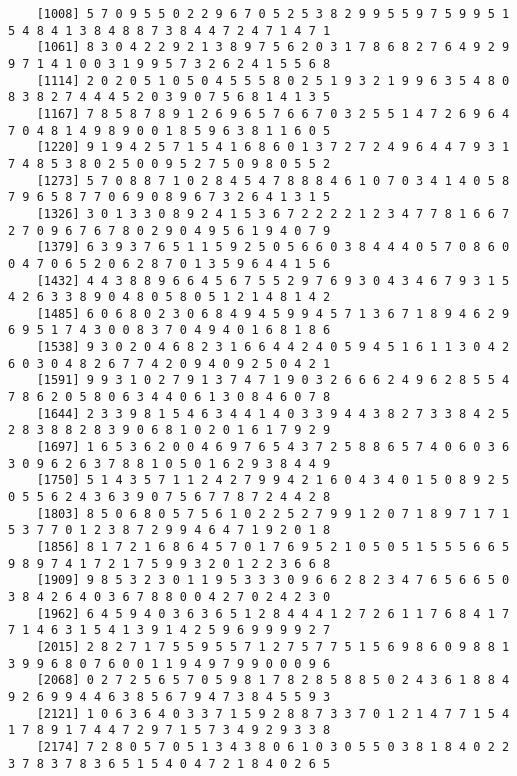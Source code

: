 \documentclass{article}
\begin{document}
\begin{itemize}
\begin{scriptsize}
\begin{verbatim}
	[1008] 5 7 0 9 5 5 0 2 2 9 6 7 0 5 2 5 3 8 2 9 9 5 5 9 7 5 9 9 5 1 5 4 8 4 1 3 8 4 8 8 7 3 8 4 4 7 2 4 7 1 4 7 1
	[1061] 8 3 0 4 2 2 9 2 1 3 8 9 7 5 6 2 0 3 1 7 8 6 8 2 7 6 4 9 2 9 9 7 1 4 1 0 0 3 1 9 9 5 7 3 2 6 2 4 1 5 5 6 8
	[1114] 2 0 2 0 5 1 0 5 0 4 5 5 5 8 0 2 5 1 9 3 2 1 9 9 6 3 5 4 8 0 8 3 8 2 7 4 4 4 5 2 0 3 9 0 7 5 6 8 1 4 1 3 5
	[1167] 7 8 5 8 7 8 9 1 2 6 9 6 5 7 6 6 7 0 3 2 5 5 1 4 7 2 6 9 6 4 7 0 4 8 1 4 9 8 9 0 0 1 8 5 9 6 3 8 1 1 6 0 5
	[1220] 9 1 9 4 2 5 7 1 5 4 1 6 8 6 0 1 3 7 2 7 2 4 9 6 4 4 7 9 3 1 7 4 8 5 3 8 0 2 5 0 0 9 5 2 7 5 0 9 8 0 5 5 2
	[1273] 5 7 0 8 8 7 1 0 2 8 4 5 4 7 8 8 8 4 6 1 0 7 0 3 4 1 4 0 5 8 7 9 6 5 8 7 7 0 6 9 0 8 9 6 7 3 2 6 4 1 3 1 5
	[1326] 3 0 1 3 3 0 8 9 2 4 1 5 3 6 7 2 2 2 2 1 2 3 4 7 7 8 1 6 6 7 2 7 0 9 6 7 6 7 8 0 2 9 0 4 9 5 6 1 9 4 0 7 9
	[1379] 6 3 9 3 7 6 5 1 1 5 9 2 5 0 5 6 6 0 3 8 4 4 4 0 5 7 0 8 6 0 0 4 7 0 6 5 2 0 6 2 8 7 0 1 3 5 9 6 4 4 1 5 6
	[1432] 4 4 3 8 8 9 6 6 4 5 6 7 5 5 2 9 7 6 9 3 0 4 3 4 6 7 9 3 1 5 4 2 6 3 3 8 9 0 4 8 0 5 8 0 5 1 2 1 4 8 1 4 2
	[1485] 6 0 6 8 0 2 3 0 6 8 4 9 4 5 9 9 4 5 7 1 3 6 7 1 8 9 4 6 2 9 6 9 5 1 7 4 3 0 0 8 3 7 0 4 9 4 0 1 6 8 1 8 6
	[1538] 9 3 0 2 0 4 6 8 2 3 1 6 6 4 4 2 4 0 5 9 4 5 1 6 1 1 3 0 4 2 6 0 3 0 4 8 2 6 7 7 4 2 0 9 4 0 9 2 5 0 4 2 1
	[1591] 9 9 3 1 0 2 7 9 1 3 7 4 7 1 9 0 3 2 6 6 6 2 4 9 6 2 8 5 5 4 7 8 6 2 0 5 8 0 6 3 4 4 0 6 1 3 0 8 4 6 0 7 8
	[1644] 2 3 3 9 8 1 5 4 6 3 4 4 1 4 0 3 3 9 4 4 3 8 2 7 3 3 8 4 2 5 2 8 3 8 8 2 8 3 9 0 6 8 1 0 2 0 1 6 1 7 9 2 9
	[1697] 1 6 5 3 6 2 0 0 4 6 9 7 6 5 4 3 7 2 5 8 8 6 5 7 4 0 6 0 3 6 3 0 9 6 2 6 3 7 8 8 1 0 5 0 1 6 2 9 3 8 4 4 9
	[1750] 5 1 4 3 5 7 1 1 2 4 2 7 9 9 4 2 1 6 0 4 3 4 0 1 5 0 8 9 2 5 0 5 5 6 2 4 3 6 3 9 0 7 5 6 7 7 8 7 2 4 4 2 8
	[1803] 8 5 0 6 8 0 5 7 5 6 1 0 2 2 5 2 7 9 9 1 2 0 7 1 8 9 7 1 7 1 5 3 7 7 0 1 2 3 8 7 2 9 9 4 6 4 7 1 9 2 0 1 8
	[1856] 8 1 7 2 1 6 8 6 4 5 7 0 1 7 6 9 5 2 1 0 5 0 5 1 5 5 5 6 6 5 9 8 9 7 4 1 7 2 1 7 5 9 9 3 2 0 1 2 2 3 6 6 8
	[1909] 9 8 5 3 2 3 0 1 1 9 5 3 3 3 0 9 6 6 2 8 2 3 4 7 6 5 6 6 5 0 3 8 4 2 6 4 0 3 6 7 8 8 0 0 4 2 7 0 2 4 2 3 0
	[1962] 6 4 5 9 4 0 3 6 3 6 5 1 2 8 4 4 4 1 2 7 2 6 1 1 7 6 8 4 1 7 7 1 4 6 3 1 5 4 1 3 9 1 4 2 5 9 6 9 9 9 9 2 7
	[2015] 2 8 2 7 1 7 5 5 9 5 5 7 1 2 7 5 7 7 5 1 5 6 9 8 6 0 9 8 8 1 3 9 9 6 8 0 7 6 0 0 1 1 9 4 9 7 9 9 0 0 0 9 6
	[2068] 0 2 7 2 5 6 5 7 0 5 9 8 1 7 8 2 8 5 8 8 5 0 2 4 3 6 1 8 8 4 9 2 6 9 9 4 4 6 3 8 5 6 7 9 4 7 3 8 4 5 5 9 3
	[2121] 1 0 6 3 6 4 0 3 3 7 1 5 9 2 8 8 7 3 3 7 0 1 2 1 4 7 7 1 5 4 1 7 8 9 1 7 4 4 7 2 9 7 1 5 7 3 4 9 2 9 3 3 8
	[2174] 7 2 8 0 5 7 0 5 1 3 4 3 8 0 6 1 0 3 0 5 5 0 3 8 1 8 4 0 2 2 3 7 8 3 7 8 3 6 5 1 5 4 0 4 7 2 1 8 4 0 2 6 5

\end{verbatim}
\end{scriptsize}
\end{itemize}
\end{document}
